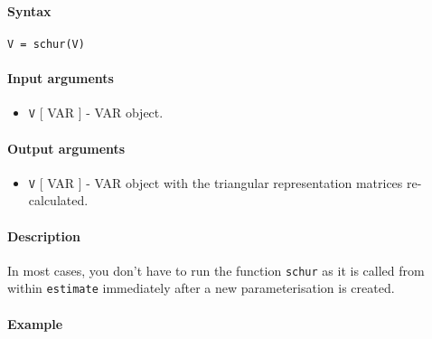 


	\paragraph{Syntax}

\begin{verbatim}
V = schur(V)
\end{verbatim}

\paragraph{Input arguments}

\begin{itemize}
\itemsep1pt\parskip0pt
\item
  \texttt{V} {[} VAR {]} - VAR object.
\end{itemize}

\paragraph{Output arguments}

\begin{itemize}
\itemsep1pt\parskip0pt
\item
  \texttt{V} {[} VAR {]} - VAR object with the triangular representation
  matrices re-calculated.
\end{itemize}

\paragraph{Description}

In most cases, you don't have to run the function \texttt{schur} as it
is called from within \texttt{estimate} immediately after a new
parameterisation is created.

\paragraph{Example}


